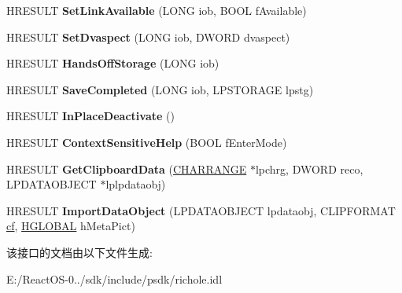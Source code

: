\begin{DoxyCompactItemize}
\item 
\mbox{\label{interface_i_rich_edit_ole_a2e7f79858610fa940b1cc6193abaca4c}} 
H\+R\+E\+S\+U\+LT {\bfseries Set\+Link\+Available} (L\+O\+NG iob, B\+O\+OL f\+Available)
\item 
\mbox{\label{interface_i_rich_edit_ole_a6b35256e39b01bdba3fed39708afc1a9}} 
H\+R\+E\+S\+U\+LT {\bfseries Set\+Dvaspect} (L\+O\+NG iob, D\+W\+O\+RD dvaspect)
\item 
\mbox{\label{interface_i_rich_edit_ole_aa0d4037c5cd127d50b14d73cf5a1d6a0}} 
H\+R\+E\+S\+U\+LT {\bfseries Hands\+Off\+Storage} (L\+O\+NG iob)
\item 
\mbox{\label{interface_i_rich_edit_ole_a9b466b13ee15cc735bbd010720b50751}} 
H\+R\+E\+S\+U\+LT {\bfseries Save\+Completed} (L\+O\+NG iob, L\+P\+S\+T\+O\+R\+A\+GE lpstg)
\item 
\mbox{\label{interface_i_rich_edit_ole_a27a25fd87dec54bfa718e80e479a17f4}} 
H\+R\+E\+S\+U\+LT {\bfseries In\+Place\+Deactivate} ()
\item 
\mbox{\label{interface_i_rich_edit_ole_a8a096a888e08639f26927b96876a0b18}} 
H\+R\+E\+S\+U\+LT {\bfseries Context\+Sensitive\+Help} (B\+O\+OL f\+Enter\+Mode)
\item 
\mbox{\label{interface_i_rich_edit_ole_affdc35bc7849d8a5813f420934e94642}} 
H\+R\+E\+S\+U\+LT {\bfseries Get\+Clipboard\+Data} (\hyperlink{struct__charrange}{C\+H\+A\+R\+R\+A\+N\+GE} $\ast$lpchrg, D\+W\+O\+RD reco, L\+P\+D\+A\+T\+A\+O\+B\+J\+E\+CT $\ast$lplpdataobj)
\item 
\mbox{\label{interface_i_rich_edit_ole_a27f4e461315af32212e360f53a3fdda4}} 
H\+R\+E\+S\+U\+LT {\bfseries Import\+Data\+Object} (L\+P\+D\+A\+T\+A\+O\+B\+J\+E\+CT lpdataobj, C\+L\+I\+P\+F\+O\+R\+M\+AT \hyperlink{structcf}{cf}, \hyperlink{interfacevoid}{H\+G\+L\+O\+B\+AL} h\+Meta\+Pict)
\end{DoxyCompactItemize}


该接口的文档由以下文件生成\+:\begin{DoxyCompactItemize}
\item 
E\+:/\+React\+O\+S-\/0../sdk/include/psdk/richole.\+idl\end{DoxyCompactItemize}
